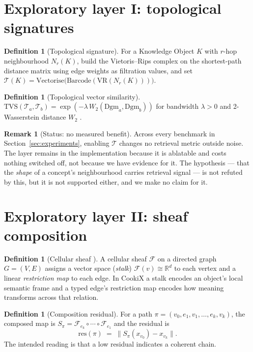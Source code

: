\documentclass[11pt]{article}
\theoremstyle{definition}
\newtheorem{definition}[theorem]{Definition}
\newtheorem{remark}[theorem]{Remark}
\begin{document}
\section{Exploratory layer I: topological signatures}

\begin{definition}[Topological signature]
For a Knowledge Object $K$ with $r$-hop neighbourhood $N_r(K)$, build the
Vietoris--Rips complex on the shortest-path distance matrix using edge weights as
filtration values, and set
$\mathcal{T}(K)=\mathrm{Vectorise}\bigl(\mathrm{Barcode}(\mathrm{VR}(N_r(K)))\bigr)$.
\end{definition}

\begin{definition}[Topological vector similarity]
$\mathrm{TVS}(\mathcal{T}_a,\mathcal{T}_b)=\exp(-\lambda\,W_2(\mathrm{Dgm}_a,
\mathrm{Dgm}_b))$ for bandwidth $\lambda>0$ and 2-Wasserstein distance $W_2$
\cite{edelsbrunner2010computational}.
\end{definition}

\begin{remark}[Status: no measured benefit]
\label{rem:topo-status}
Across every benchmark in Section~\ref{sec:experiments}, enabling $\mathcal{T}$ changes
no retrieval metric outside noise. The layer remains in the implementation because it
is ablatable and costs nothing switched off, not because we have evidence for it. The
hypothesis --- that the \emph{shape} of a concept's neighbourhood carries retrieval
signal --- is not refuted by this, but it is not supported either, and we make no claim
for it.
\end{remark}

\section{Exploratory layer II: sheaf composition}
\label{sec:sheaf}

\begin{definition}[Cellular sheaf \cite{curry2014sheaves,hansen2019toward}]
A cellular sheaf $\mathcal{F}$ on a directed graph $G=(V,E)$ assigns a vector space
(\emph{stalk}) $\mathcal{F}(v)\cong\mathbb{R}^{d}$ to each vertex and a linear
\emph{restriction map} to each edge. In CookiX a stalk encodes an object's local
semantic frame and a typed edge's restriction map encodes how meaning transforms across
that relation.
\end{definition}

\begin{definition}[Composition residual]
For a path $\pi=(v_0,e_1,v_1,\dots,e_k,v_k)$, the composed map is
$S_\pi=\mathcal{F}_{e_k}\circ\cdots\circ\mathcal{F}_{e_1}$ and the residual is
\begin{equation}
  \mathrm{res}(\pi) \;=\; \lVert S_\pi(x_{v_0}) - x_{v_k}\rVert.
  \label{eq:residual}
\end{equation}
The intended reading is that a low residual indicates a coherent chain.
\end{definition}
\end{document}
